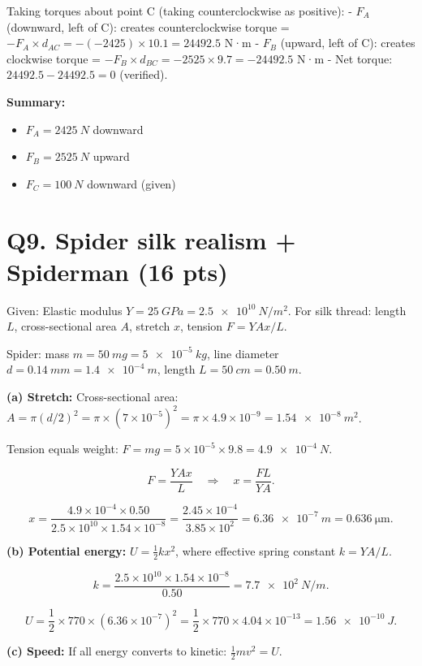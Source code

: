 \documentclass[11pt]{article}
\newcommand{\ans}[1]{\boxed{\displaystyle #1}}
\begin{document}
Taking torques about point C (taking counterclockwise as positive):
- $F_A$ (downward, left of C): creates counterclockwise torque = $-F_A \times d_{AC} = -(-2425) \times 10.1 = 24492.5$ N·m
- $F_B$ (upward, left of C): creates clockwise torque = $-F_B \times d_{BC} = -2525 \times 9.7 = -24492.5$ N·m
- Net torque: $24492.5 - 24492.5 = 0$ (verified).

\textbf{Summary:}
\begin{itemize}
  \item $F_A = \ans{\SI{2425}{N}}$ downward
  \item $F_B = \ans{\SI{2525}{N}}$ upward  
  \item $F_C = \SI{100}{N}$ downward (given)
\end{itemize}

\section*{Q9. Spider silk realism + Spiderman (16 pts)}
Given: Elastic modulus $Y = \SI{25}{GPa} = \SI{2.5e10}{N/m^2}$. For silk thread: length $L$, cross-sectional area $A$, stretch $x$, tension $F = YA x/L$.

Spider: mass $m = \SI{50}{mg} = \SI{5e-5}{kg}$, line diameter $d = \SI{0.14}{mm} = \SI{1.4e-4}{m}$, length $L = \SI{50}{cm} = \SI{0.50}{m}$.

\textbf{(a) Stretch:} Cross-sectional area: $A = \pi(d/2)^2 = \pi \times (7 \times 10^{-5})^2 = \pi \times 4.9 \times 10^{-9} = \SI{1.54e-8}{m^2}$.

Tension equals weight: $F = mg = 5 \times 10^{-5} \times 9.8 = \SI{4.9e-4}{N}$.

\[ F = \frac{YA x}{L} \quad\Rightarrow\quad x = \frac{FL}{YA}. \]

\[ x = \frac{4.9 \times 10^{-4} \times 0.50}{2.5 \times 10^{10} \times 1.54 \times 10^{-8}} = \frac{2.45 \times 10^{-4}}{3.85 \times 10^{2}} = \ans{\SI{6.36e-7}{m} = \SI{0.636}{\micro\meter}}. \]

\textbf{(b) Potential energy:} $U = \frac{1}{2}kx^2$, where effective spring constant $k = YA/L$.

\[ k = \frac{2.5 \times 10^{10} \times 1.54 \times 10^{-8}}{0.50} = \SI{7.7e2}{N/m}. \]

\[ U = \frac{1}{2} \times 770 \times (6.36 \times 10^{-7})^2 = \frac{1}{2} \times 770 \times 4.04 \times 10^{-13} = \ans{\SI{1.56e-10}{J}}. \]

\textbf{(c) Speed:} If all energy converts to kinetic: $\frac{1}{2}mv^2 = U$.
\end{document}
